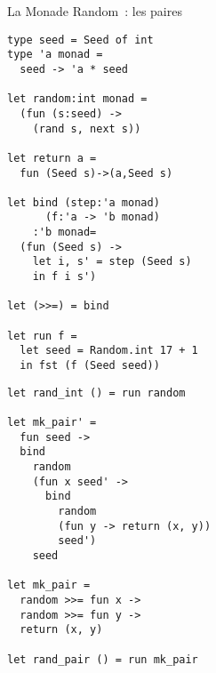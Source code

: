 \documentclass[10pt]{beamer}
\begin{document}
\begin{frame}[fragile]{La Monade Random~: les paires}
  \begin{multicols*}{2}
\begin{verbatim}
type seed = Seed of int
type 'a monad =
  seed -> 'a * seed

let random:int monad =
  (fun (s:seed) ->
    (rand s, next s))

let return a =
  fun (Seed s)->(a,Seed s)

let bind (step:'a monad)
      (f:'a -> 'b monad)
    :'b monad=
  (fun (Seed s) ->
    let i, s' = step (Seed s)
    in f i s')

let (>>=) = bind

let run f =
  let seed = Random.int 17 + 1
  in fst (f (Seed seed))
\end{verbatim}
    \columnbreak{}
\begin{verbatim}
let rand_int () = run random

let mk_pair' =
  fun seed ->
  bind
    random
    (fun x seed' ->
      bind
        random
        (fun y -> return (x, y))
        seed')
    seed

let mk_pair =
  random >>= fun x ->
  random >>= fun y ->
  return (x, y)

let rand_pair () = run mk_pair
\end{verbatim}
  \end{multicols*}
\end{frame}
\end{document}
